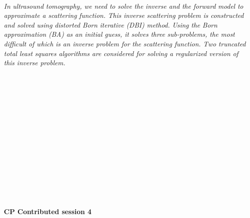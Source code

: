 \begin{multicols}{2}
\\
      \textit{In ultrasound tomography, we need to solve the inverse and the forward model to approximate a scattering function. This inverse scattering problem is constructed and solved using distorted Born iterative (DBI) method.  Using the Born approximation (BA) as an initial guess, it solves three sub-problems, the most difficult of which is an inverse problem for the scattering function.  Two truncated total least squares algorithms are considered for solving a regularized version of this inverse problem.}\\
\\ 
        \\
        \\\\
        \\
        \\\\
        \\
        \\\\
        \\
        \\\\
\\
\end{multicols}
  \noindent\textbf{CP Contributed session 4}\\
  \textit{} \\
    

